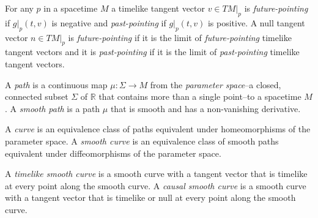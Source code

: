 \begin{definition}
    \label{def:future-and-past-pointing-vectors}
    \leanok
    For any $p$ in a spacetime $M$ a timelike tangent vector $v \in TM|_p$ is \textit{future-pointing} if $g|_p(t,v)$ is negative and \textit{past-pointing} if $g|_p(t,v)$ is positive. A null tangent vector $n \in TM|_p$ is \textit{future-pointing} if it is the limit of \textit{future-pointing} timelike tangent vectors and it is \textit{past-pointing} if it is the limit of \textit{past-pointing} timelike tangent vectors.
\end{definition}

\begin{definition}[Paths]
    \label{def:paths}
    \leanok
    A \textit{path} is a continuous map $\mu :\Sigma \rightarrow M$ from the \textit{parameter space}--a closed, connected subset $\Sigma$ of $\mathbb{R}$ that contains more than a single point--to a spacetime $M$. A \textit{smooth path} is a path $\mu$ that is smooth and has a non-vanishing derivative.
\end{definition}

\begin{definition}[Curves]
    \label{def:curves}
    \leanok
    A \textit{curve} is an equivalence class of paths equivalent under homeomorphisms of the parameter space. A \textit{smooth curve} is an equivalence class of smooth paths equivalent under diffeomorphisms of the parameter space.
\end{definition}

\begin{definition}
    \label{def:timelike-and-causal-smooth-curves}
    \leanok
    A \textit{timelike smooth curve} is a smooth curve with a tangent vector that is timelike at every point along the smooth curve. A \textit{causal smooth curve} is a smooth curve with a tangent vector that is timelike or null at every point along the smooth curve.
\end{definition}

